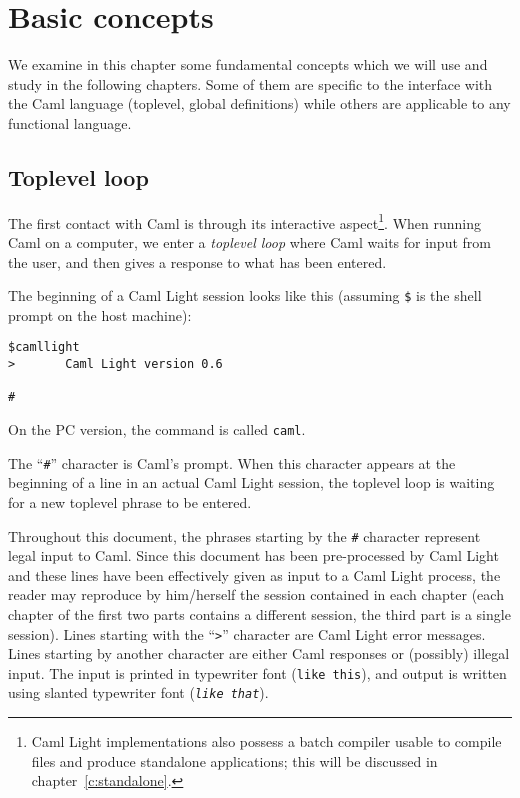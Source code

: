 \chapter{Basic concepts}
\label{c:basicconcepts}

We examine in this chapter some fundamental concepts which we will
use and study in the following chapters. Some of them are specific to the
interface with the Caml language (toplevel, global definitions) while others
are applicable to any functional language.

\section{Toplevel loop}

The first contact with Caml is through its interactive
aspect\footnote{Caml Light implementations also possess a batch
compiler usable to compile files and produce standalone applications;
this will be discussed in chapter~\ref{c:standalone}.}. When running
Caml on a computer, we enter a {\em toplevel loop} where Caml waits
for input from the user, and then gives a response to what has been
entered.

The beginning of a Caml Light session looks like this (assuming
\verb|$| is the shell prompt on the host machine):
\begin{verbatim}
$camllight
>       Caml Light version 0.6

#
\end{verbatim}
On the PC version, the command is called {\tt caml}.
\def\sharp{{\tt\#}}

The ``{\sharp}'' character is Caml's prompt. When this character
appears at the beginning of a line in an actual Caml Light session,
the toplevel loop is waiting for a new toplevel phrase to be entered.

Throughout this document, the phrases starting by the {\sharp}
character represent legal input to Caml. Since this document has been
pre-processed by Caml Light and these lines have been effectively
given as input to a Caml Light process, the reader may reproduce by
him/herself the session contained in each chapter (each chapter of the
first two parts contains a different session, the third part is a
single session). Lines starting with the ``\verb|>|'' character are
Caml Light error messages. Lines starting by another
character are either Caml responses or (possibly) illegal input. The
input is printed in typewriter font ({\tt like this}), and output is
written using slanted typewriter font ({\tt \sl like that}).

